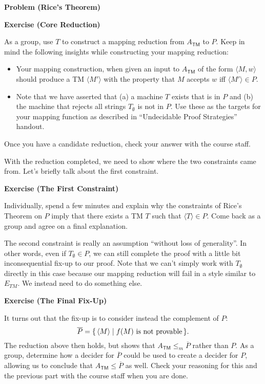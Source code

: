 \documentclass[12pt]{article}
\newenvironment{exercise}[1]{%
  \begin{shaded}
  \noindent\textbf{Exercise (#1)}\quad
}{\end{shaded}}
\newcounter{ProblemCounter}
\newenvironment{problem}[1][]
  {\refstepcounter{ProblemCounter}\noindent\textbf{Problem \theProblemCounter{} (#1)}\quad}
  {\newpage}
\newcommand{\desc}[1]{\ensuremath{\langle #1 \rangle}}
\newcommand{\Atm}{\ensuremath{A_\mathsf{TM}}\xspace}
\begin{document}
\begin{problem}[Rice's Theorem]
\begin{exercise}{Core Reduction}
  As a group, use \( T \) to construct a mapping reduction from \( \Atm \) to \(
  P \).  Keep in mind the following insights while constructing your mapping
  reduction:
  \begin{itemize}
    \item Your mapping construction, when given an input to \Atm of the form
      \( \desc{M, w} \) should produce a TM \( \desc{M'} \) with the property
      that \( M \) accepts \( w \) iff \( \desc{M'} \in P \).
    \item Note that we have asserted that (a) a machine \( T \) exists that is
      in \( P \) and (b) the machine that rejects all strings \( T_\emptyset \)
      is not in \( P \).  Use these as the targets for your mapping function as
      described in ``Undecidable Proof Strategies'' handout.
  \end{itemize}
  Once you have a candidate reduction, check your answer with the course staff.
\end{exercise}

With the reduction completed, we need to show where the two constraints came
from.  Let's briefly talk about the first constraint.

\begin{exercise}{The First Constraint}
  Individually, spend a few minutes and explain why the constraints of Rice's
  Theorem on \( P \) imply that there exists a TM \( T \) such that \( \desc{T}
  \in P \).  Come back as a group and agree on a final explanation.
\end{exercise}

The second constraint is really an assumption ``without loss of generality''.
In other words, even if \( T_\emptyset \in P \), we can still complete the
proof with a little bit inconsequential fix-up to our proof.  Note that we
can't simply work with \( T_\emptyset \) directly in this case because our
mapping reduction will fail in a style similar to \( E_{TM} \).  We instead
need to do something else.

\begin{exercise}{The Final Fix-Up}
  It turns out that the fix-up is to consider instead the complement of \( P \):
  \[
    \overline{P} = \{\, \desc{M} \mid \text{\( f(M) \) is not provable} \,\}.
  \]
  The reduction above then holds, but shows that \( \Atm \leq_m \overline{P} \)
  rather than \( P \). As a group, determine how a decider for \( \overline{P}
  \) could be used to create a decider for \( P \), allowing us to conclude
  that \( \Atm \leq \overline{P} \) as well.  Check your reasoning for this and
  the previous part with the course staff when you are done.
\end{exercise}

\end{problem}
\end{document}
